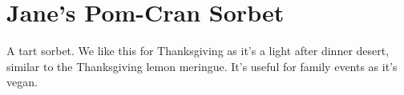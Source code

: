\section[Pomegranate Sorbet]{Jane's Pom-Cran Sorbet}

\begin{recipestats}[
        servings=12,
        preptime=15~\minute,
        bakingtime=45~\minute,
        inactivetime=8~\hour,
        original=\citefield{cranberrySorbetVegetarianBaker}{shorttitle}~\cite{cranberrySorbetVegetarianBaker},
    ]
\end{recipestats}

\begin{recipeabstract}
    A tart sorbet.
    We like this for Thanksgiving as it's a light after dinner desert, similar to the Thanksgiving lemon meringue.
    It's useful for family events as it's vegan.
\end{recipeabstract}

\begin{ingredientcolumns}
    \begin{ingredientblock}
        \\
        \\
        \\
    \end{ingredientblock}

    \columnbreak
    \bigskip
    \begin{ingredientblock}
        \\
        \\
    \end{ingredientblock}

    \bigskip
    \begin{ingredientblock}[syrup]
        \\
    \end{ingredientblock}

\end{ingredientcolumns}

